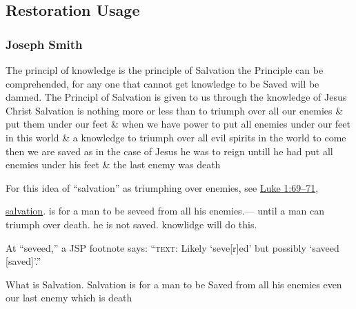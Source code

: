 
\subsection{Restoration Usage} %
	\label{SALVATION-RESTORATION}

	\subsubsection{Joseph Smith} %
		\label{SALVATION-JS}
	
		\begin{compactdesc}
		
			\item[{\hyperlink{EMS-1843-JS-14-MAY-1843-A-WW-a}{14 May 1843 WW-a}}] The principl of knowledge is the principle of Salvation the Principle can be comprehended, for any one that cannot get knowledge to be Saved will be damned. The Principl of Salvation is given to us through the knowledge of Jesus Christ Salvation is nothing more or less than to triumph over all our enemies \& put them under our feet \& when we have power to put all enemies under our feet in this world \& a knowledge to triumph over all evil spirits in the world to come then we are saved as in the case of Jesus he was to reign untill he had put all enemies under his feet \& the last enemy was death
				\begin{compactitem}
					\item For this idea of ``salvation'' as triumphing over enemies, see \hyperref[LUKE-1-69]{Luke 1:69--71}, 
				\end{compactitem}
			
			\item[{\hyperref[EMS-1843-JS-21-MAY-1843-WR]{21 May 1843 (Willard Richards)}}] \uline{salvation}. is for a man to be seveed from all his enemies.--- until a man can triumph over death. he is not saved. knowlidge will do this.
				\begin{compactitem}
					\item At ``seveed,'' a JSP footnote says: ``\textsc{text}: Likely `seve[r]ed' but possibly `saveed [saved]'.''
				\end{compactitem} 
			
			\item[{\hyperref[EMS-1843-JS-21-MAY-1843-HC]{21 May 1843 (Howard Coray)}}] What is Salvation. Salvation is for a man to be Saved from all his enemies even our last enemy which is death
			
		\end{compactdesc}
		
